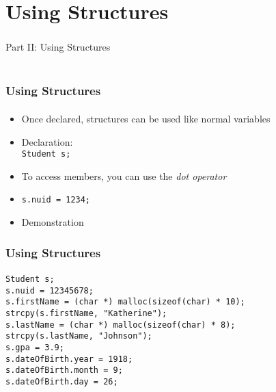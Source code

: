 \documentclass[]{beamer}
\begin{document}
\section{Using Structures}

\begin{frame}
    \frametitle{}
    \framesubtitle{}
    
    \begin{center}
    {\Huge Part II: Using Structures}\\
    {\Large ~}
    \end{center}

\end{frame}

\begin{frame}[fragile]
  \frametitle{Using Structures}
  \framesubtitle{}

\begin{itemize}[<+->]
  \item Once declared, structures can be used like normal variables
  \item Declaration: \\
  \texttt{Student s;}
  \item To access members, you can use the \emph{dot operator}
  \item \texttt{s.nuid = 1234;}
  \item Demonstration
\end{itemize}

\end{frame}

\begin{frame}[fragile]
  \frametitle{Using Structures}
  \framesubtitle{}

\begin{verbatim}
Student s;
s.nuid = 12345678;
s.firstName = (char *) malloc(sizeof(char) * 10);
strcpy(s.firstName, "Katherine");
s.lastName = (char *) malloc(sizeof(char) * 8);
strcpy(s.lastName, "Johnson");
s.gpa = 3.9;
s.dateOfBirth.year = 1918;
s.dateOfBirth.month = 9;
s.dateOfBirth.day = 26;
\end{verbatim}

\end{frame}
\end{document}
